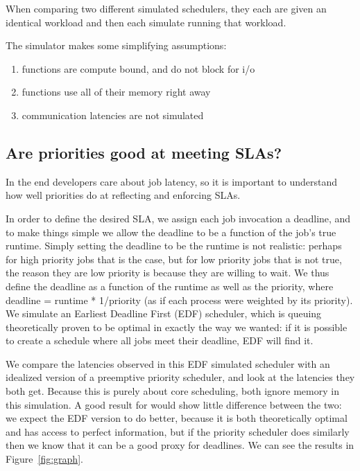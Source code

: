 When comparing two different simulated schedulers, they each are given an
identical workload and then each simulate running that workload.

The simulator makes some simplifying assumptions:
\begin{enumerate}
    \item functions are compute bound, and do not block for i/o
    \item functions use all of their memory right away
    \item communication latencies are not simulated
\end{enumerate}

\subsection{Are priorities good at meeting SLAs?}

In the end developers care about job latency, so it is important to understand
how well priorities do at reflecting and enforcing SLAs.

In order to define the desired SLA, we assign each job invocation a deadline,
and to make things simple we allow the deadline to be a function of the job's
true runtime. Simply setting the deadline to be the runtime is not realistic:
perhaps for high priority jobs that is the case, but for low priority jobs that
is not true, the reason they are low priority is because they are willing to
wait. We thus define the deadline as a function of the runtime as well as the
priority, where deadline = runtime * 1/priority (as if each process were
weighted by its priority). We
simulate an Earliest Deadline First (EDF) scheduler, which is queuing
theoretically proven to be optimal in exactly the way we wanted: if it is
possible to create a schedule where all jobs meet their deadline, EDF will find
it\cite{TODO}.

We compare the latencies observed in this EDF simulated scheduler with an
idealized version of a preemptive priority scheduler, and look at the latencies
they both get. Because this is purely about core scheduling, both ignore memory
in this simulation. A good result for \sys{} would show little difference
between the two: we expect the EDF version to do better, because it is both
theoretically optimal and has access to perfect information, but if the priority
scheduler does similarly then we know that it can be a good proxy for deadlines.
We can see the results in Figure~\ref{fig:graph}.

